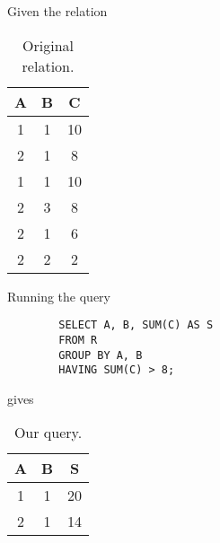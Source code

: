     \begin{example}
      Given the relation 

      \begin{table}[H]
        \centering
        \begin{tabular}{|c|c|c|}
          \hline
          \textbf{A} & \textbf{B} & \textbf{C} \\
          \hline
          1 & 1 & 10 \\ 
          2 & 1 & 8 \\ 
          1 & 1 & 10 \\ 
          2 & 3 & 8 \\ 
          2 & 1 & 6 \\ 
          2 & 2 & 2 \\ 
          \hline
        \end{tabular}
        \caption{Original relation. }
        \label{tab:groupby2}
      \end{table}
    
      Running the query 
      \begin{lstlisting}
        SELECT A, B, SUM(C) AS S 
        FROM R 
        GROUP BY A, B 
        HAVING SUM(C) > 8; 
      \end{lstlisting}
      gives 
      
      \begin{table}[H]
        \centering
        \begin{tabular}{|c|c|c|}
          \hline
          \textbf{A} & \textbf{B} & \textbf{S} \\
          \hline
          1 & 1 & 20 \\ 
          2 & 1 & 14 \\ 
          \hline
        \end{tabular}
        \caption{Our query. }
        \label{tab:groupby2_output}
      \end{table}
    \end{example}

